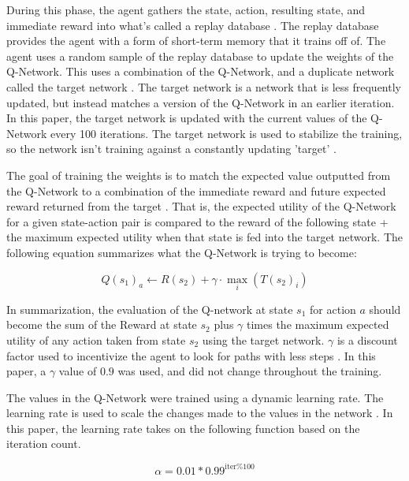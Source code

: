 \documentclass[12pt,letterpaper]{article}
\begin{document}
During this phase, the agent gathers the state, action, resulting state, and immediate reward into what's called a replay database \cite{article_reinforcement_learning_for_robots}.
The replay database provides the agent with a form of short-term memory that it trains off of.
The agent uses a random sample of the replay database to update the weights of the Q-Network.
This uses a combination of the Q-Network, and a duplicate network called the target network \cite{article_human_level_control_deep_reinforcement_learning}.
The target network is a network that is less frequently updated, but instead matches a version of the Q-Network in an earlier iteration.
In this paper, the target network is updated with the current values of the Q-Network every 100 iterations.
The target network is used to stabilize the training, so the network isn't training against a constantly updating 'target' \cite{article_human_level_control_deep_reinforcement_learning}.

The goal of training the weights is to match the expected value outputted from the Q-Network to a combination of the immediate reward and future expected reward returned from the target \cite{article_reinforcement_learning_survey}.
That is, the expected utility of the Q-Network for a given state-action pair is compared to the reward of the following state + the maximum expected utility when that state is fed into the target network.
The following equation summarizes what the Q-Network is trying to become:

$$Q(s_{1})_{a} \leftarrow R(s_2) + \gamma \cdot \max_i(T(s_2)_i)$$

In summarization, the evaluation of the Q-network at state  $s_1$ for action $a$ should become the sum of the Reward at state $s_2$ plus $\gamma$ times the maximum expected utility of any action taken from state $s_2$ using the target network.
$\gamma$ is a discount factor used to incentivize the agent to look for paths with less steps \cite{article_reinforcement_learning_for_robots}.
In this paper, a $\gamma$ value of $0.9$ was used, and did not change throughout the training.

The values in the Q-Network were trained using a dynamic learning rate.
The learning rate is used to scale the changes made to the values in the network \cite{article_reinforcement_learning_for_robots}.
In this paper, the learning rate takes on the following function based on the iteration count.

$$\alpha = 0.01 * 0.99^{\text{iter} \% 100}$$
\end{document}
